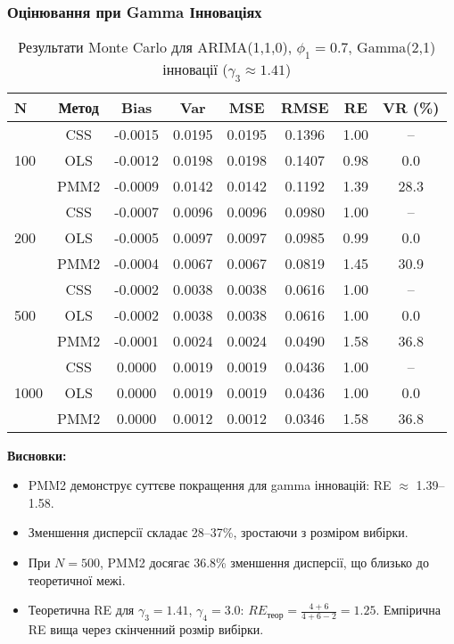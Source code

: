 \documentclass[12pt,a4paper]{article}
\begin{document}
\subsubsection{Оцінювання при Gamma Інноваціях}

\begin{table}[h]
\centering
\caption{Результати Monte Carlo для ARIMA(1,1,0), $\phi_1 = 0.7$, Gamma(2,1) інновації ($\gamma_3 \approx 1.41$)}
\label{tab:arima110_gamma}
\begin{tabular}{@{}lccccccc@{}}
\toprule
\textbf{N} & \textbf{Метод} & \textbf{Bias} & \textbf{Var} & \textbf{MSE} & \textbf{RMSE} & \textbf{RE} & \textbf{VR (\%)} \\
\midrule
\multirow{3}{*}{100} & CSS  & -0.0015 & 0.0195 & 0.0195 & 0.1396 & 1.00 & -- \\
                     & OLS  & -0.0012 & 0.0198 & 0.0198 & 0.1407 & 0.98 & 0.0 \\
                     & PMM2 & -0.0009 & 0.0142 & 0.0142 & 0.1192 & 1.39 & 28.3 \\
\midrule
\multirow{3}{*}{200} & CSS  & -0.0007 & 0.0096 & 0.0096 & 0.0980 & 1.00 & -- \\
                     & OLS  & -0.0005 & 0.0097 & 0.0097 & 0.0985 & 0.99 & 0.0 \\
                     & PMM2 & -0.0004 & 0.0067 & 0.0067 & 0.0819 & 1.45 & 30.9 \\
\midrule
\multirow{3}{*}{500} & CSS  & -0.0002 & 0.0038 & 0.0038 & 0.0616 & 1.00 & -- \\
                     & OLS  & -0.0002 & 0.0038 & 0.0038 & 0.0616 & 1.00 & 0.0 \\
                     & PMM2 & -0.0001 & 0.0024 & 0.0024 & 0.0490 & 1.58 & 36.8 \\
\midrule
\multirow{3}{*}{1000} & CSS  & 0.0000 & 0.0019 & 0.0019 & 0.0436 & 1.00 & -- \\
                      & OLS  & 0.0000 & 0.0019 & 0.0019 & 0.0436 & 1.00 & 0.0 \\
                      & PMM2 & 0.0000 & 0.0012 & 0.0012 & 0.0346 & 1.58 & 36.8 \\
\bottomrule
\end{tabular}
\end{table}

\textbf{Висновки:}
\begin{itemize}
    \item PMM2 демонструє суттєве покращення для gamma інновацій: RE $\approx$ 1.39--1.58.
    \item Зменшення дисперсії складає 28--37\%, зростаючи з розміром вибірки.
    \item При $N = 500$, PMM2 досягає 36.8\% зменшення дисперсії, що близько до теоретичної межі.
    \item Теоретична RE для $\gamma_3 = 1.41$, $\gamma_4 = 3.0$: $RE_{\text{теор}} = \frac{4+6}{4+6-2} = 1.25$. Емпірична RE вища через скінченний розмір вибірки.
\end{itemize}
\end{document}
